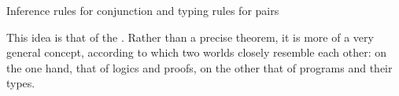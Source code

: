 \begin{marginfigure}




  
  \caption{Inference rules for conjunction and typing rules for pairs}
  \label{fig:curry-howard-example-en}
\end{marginfigure}

This idea is that of the .%
%
%
Rather than a precise theorem,
it is more of a very general concept, according to which two worlds closely resemble each
other: on the one hand, that of logics and proofs, on the other that of programs
and their types.

